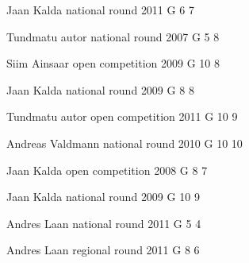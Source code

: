 \documentclass[11pt]{article}
\begin{document}
\ylDisplay{} %
{Jaan Kalda} %
{national round} %
{2011} %
{G 6} %
{7} %
{

\ifEngSolution
\fi
}

\ylDisplay{} %
{Tundmatu autor} %
{national round} %
{2007} %
{G 5} %
{8} %
{

\ifEngSolution
\fi
}

\ylDisplay{} %
{Siim Ainsaar} %
{open competition} %
{2009} %
{G 10} %
{8} %
{

\ifEngSolution
\fi
}

\ylDisplay{} %
{Jaan Kalda} %
{national round} %
{2009} %
{G 8} %
{8} %
{

\ifEngSolution
\fi
}

\ylDisplay{} %
{Tundmatu autor} %
{open competition} %
{2011} %
{G 10} %
{9} %
{

\ifEngSolution
\fi
}

\ylDisplay{} %
{Andreas Valdmann} %
{national round} %
{2010} %
{G 10} %
{10} %
{

\ifEngSolution
\fi
}

\ylDisplay{} %
{Jaan Kalda} %
{open competition} %
{2008} %
{G 8} %
{7} %
{

\ifEngSolution
\fi
}

\ylDisplay{} %
{Jaan Kalda} %
{national round} %
{2009} %
{G 10} %
{9} %
{

\ifEngSolution
\fi
}

\ylDisplay{} %
{Andres Laan} %
{national round} %
{2011} %
{G 5} %
{4} %
{

\ifEngSolution
\fi
}

\ylDisplay{} %
{Andres Laan} %
{regional round} %
{2011} %
{G 8} %
{6} %
{

\ifEngSolution
\fi
}
\end{document}
